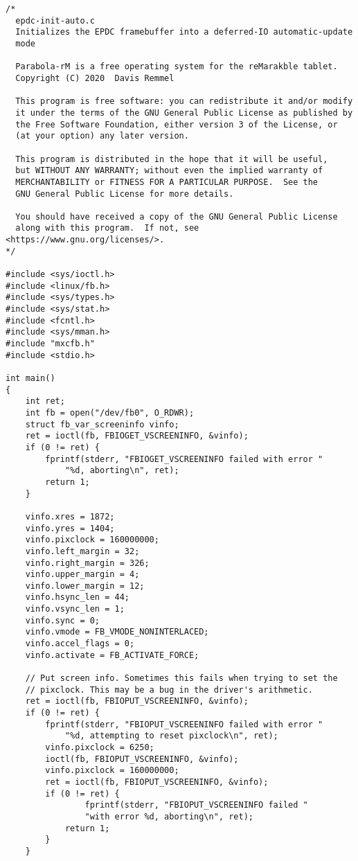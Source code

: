 \documentclass{memoir}
\begin{document}
\begin{verbatim}
/*
  epdc-init-auto.c
  Initializes the EPDC framebuffer into a deferred-IO automatic-update
  mode

  Parabola-rM is a free operating system for the reMarakble tablet.
  Copyright (C) 2020  Davis Remmel

  This program is free software: you can redistribute it and/or modify
  it under the terms of the GNU General Public License as published by
  the Free Software Foundation, either version 3 of the License, or
  (at your option) any later version.

  This program is distributed in the hope that it will be useful,
  but WITHOUT ANY WARRANTY; without even the implied warranty of
  MERCHANTABILITY or FITNESS FOR A PARTICULAR PURPOSE.  See the
  GNU General Public License for more details.

  You should have received a copy of the GNU General Public License
  along with this program.  If not, see <https://www.gnu.org/licenses/>.
*/

#include <sys/ioctl.h>
#include <linux/fb.h>
#include <sys/types.h>
#include <sys/stat.h>
#include <fcntl.h>
#include <sys/mman.h>
#include "mxcfb.h"
#include <stdio.h>

int main()
{
	int ret;
	int fb = open("/dev/fb0", O_RDWR);
	struct fb_var_screeninfo vinfo;
	ret = ioctl(fb, FBIOGET_VSCREENINFO, &vinfo);
	if (0 != ret) {
		fprintf(stderr, "FBIOGET_VSCREENINFO failed with error "
			"%d, aborting\n", ret);
		return 1;
	}

	vinfo.xres = 1872;
	vinfo.yres = 1404;
	vinfo.pixclock = 160000000;
	vinfo.left_margin = 32;
	vinfo.right_margin = 326;
	vinfo.upper_margin = 4;
	vinfo.lower_margin = 12;
	vinfo.hsync_len = 44;
	vinfo.vsync_len = 1;
	vinfo.sync = 0;
	vinfo.vmode = FB_VMODE_NONINTERLACED;
	vinfo.accel_flags = 0;
	vinfo.activate = FB_ACTIVATE_FORCE;

	// Put screen info. Sometimes this fails when trying to set the
	// pixclock. This may be a bug in the driver's arithmetic.
	ret = ioctl(fb, FBIOPUT_VSCREENINFO, &vinfo);
	if (0 != ret) {
		fprintf(stderr, "FBIOPUT_VSCREENINFO failed with error "
			"%d, attempting to reset pixclock\n", ret);
		vinfo.pixclock = 6250;
		ioctl(fb, FBIOPUT_VSCREENINFO, &vinfo);
		vinfo.pixclock = 160000000;
		ret = ioctl(fb, FBIOPUT_VSCREENINFO, &vinfo);
		if (0 != ret) {
		        fprintf(stderr, "FBIOPUT_VSCREENINFO failed "
				"with error %d, aborting\n", ret);
			return 1;
		}
	}


\end{verbatim}
\end{document}
